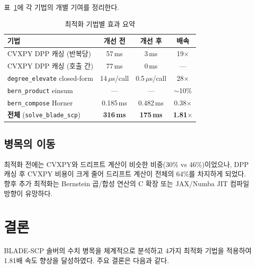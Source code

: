 \documentclass[11pt]{article}
\begin{document}
표~\ref{tab:summary}에 각 기법의 개별 기여를 정리한다.

\begin{table}[h]
\centering
\caption{최적화 기법별 효과 요약}
\label{tab:summary}
\begin{tabular}{lccc}
\toprule
기법 & 개선 전 & 개선 후 & 배속 \\
\midrule
CVXPY DPP 캐싱 (반복당) & 57\,ms & 3\,ms & 19$\times$ \\
CVXPY DPP 캐싱 (호출 간) & 77\,ms & 0\,ms & --- \\
\texttt{degree\_elevate} closed-form & 14\,$\mu$s/call & 0.5\,$\mu$s/call & 28$\times$ \\
\texttt{bern\_product} einsum & --- & --- & $\sim$10\% \\
\texttt{bern\_compose} Horner & 0.185\,ms & 0.482\,ms & 0.38$\times$ \\
\midrule
\textbf{전체} (\texttt{solve\_blade\_scp}) & \textbf{316\,ms} & \textbf{175\,ms} & \textbf{1.81$\times$} \\
\bottomrule
\end{tabular}
\end{table}

\subsection{병목의 이동}

최적화 전에는 CVXPY와 드리프트 계산이
비슷한 비중(30\% vs 46\%)이었으나,
DPP 캐싱 후 CVXPY 비용이 크게 줄어
드리프트 계산이 전체의 64\%를 차지하게 되었다.
향후 추가 최적화는 Bernstein 곱/합성 연산의
C 확장 또는 JAX/Numba JIT 컴파일 방향이 유망하다.


\section{결론}

BLADE-SCP 솔버의 수치 병목을 체계적으로 분석하고
4가지 최적화 기법을 적용하여 1.81배 속도 향상을 달성하였다.
주요 결론은 다음과 같다.
\end{document}
